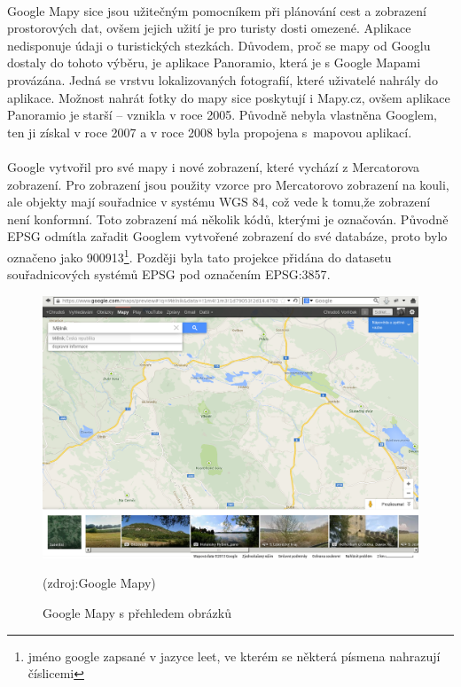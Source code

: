 \documentclass[11pt,a4paper,titlepage,oneside]{book}
\begin{document}
		\paragraph{} Google Mapy sice jsou užitečným pomocníkem při plánování cest a zobrazení prostorových dat, ovšem jejich užití je pro turisty dosti omezené. Aplikace nedisponuje údaji o turistických stezkách. Důvodem, proč se mapy od Googlu dostaly do tohoto výběru, je aplikace Panoramio, která je s Google Mapami provázána. Jedná se vrstvu lokalizovaných fotografií, které uživatelé nahrály do aplikace. Možnost nahrát fotky do mapy sice poskytují i  Mapy.cz, ovšem aplikace Panoramio je starší -- vznikla v roce 2005. Původně nebyla vlastněna Googlem, ten ji získal v roce 2007 a v roce 2008 byla propojena s~mapovou aplikací. 


		\paragraph{}  Google vytvořil pro své mapy i nové zobrazení, které vychází z Mercatorova zobrazení. Pro zobrazení jsou použity vzorce pro Mercatorovo zobrazení na kouli, ale objekty mají  souřadnice v systému \ac{WGS 84}, což vede k tomu,že zobrazení není konformní\cite{google_wiki}\label{google_mercator}. Toto zobrazení má několik kódů, kterými je označován. Původně \ac{EPSG} odmítla zařadit Googlem vytvořené zobrazení do své databáze, proto bylo označeno jako 900913\footnote{jméno google zapsané v jazyce leet, ve kterém se některá písmena nahrazují číslicemi}. Později byla tato projekce přidána do datasetu souřadnicových systémů \ac{EPSG} pod označením EPSG:3857\cite{sphericalMercator}.

		\begin{figure}[!h]
			\begin{center}
				\includegraphics[width=13cm]{obrazky/googleMaps.png}
				\caption{Google Mapy s přehledem obrázků}
				(zdroj:Google Mapy\cite{googleMap})
			\end{center}
		\end{figure}
\end{document}

